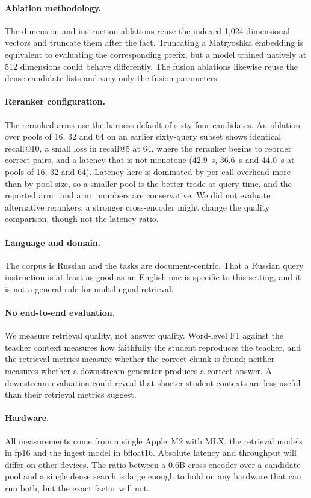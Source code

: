 \paragraph{Ablation methodology.}
The dimension and instruction ablations reuse the indexed 1{,}024-dimensional
vectors and truncate them after the fact. Truncating a Matryoshka embedding is
equivalent to evaluating the corresponding prefix, but a model trained natively
at 512 dimensions could behave differently. The fusion ablations likewise reuse
the dense candidate lists and vary only the fusion parameters.

\paragraph{Reranker configuration.}
The reranked arms use the harness default of sixty-four candidates. An ablation
over pools of 16, 32 and 64 on an earlier sixty-query subset shows identical
recall@10, a small loss in recall@5 at 64, where the reranker begins to reorder
correct pairs, and a latency that is not monotone (42.9~s, 36.6~s and 44.0~s at
pools of 16, 32 and 64). Latency here is dominated by per-call overhead more
than by pool size, so a smaller pool is the better trade at query time, and the
reported arm~ and arm~ numbers are conservative. We did not
evaluate alternative rerankers; a stronger cross-encoder might change the
quality comparison, though not the latency ratio.

\paragraph{Language and domain.}
The corpus is Russian and the tasks are document-centric. That a Russian query
instruction is at least as good as an English one is specific to this setting,
and it is not a general rule for multilingual retrieval.

\paragraph{No end-to-end evaluation.}
We measure retrieval quality, not answer quality. Word-level F1 against the
teacher context measures how faithfully the student reproduces the teacher, and
the retrieval metrics measure whether the correct chunk is found; neither
measures whether a downstream generator produces a correct answer. A downstream
evaluation could reveal that shorter student contexts are less useful than their
retrieval metrics suggest.

\paragraph{Hardware.}
All measurements come from a single Apple~M2 with MLX, the retrieval models in
fp16 and the ingest model in bfloat16. Absolute latency and throughput will
differ on other devices. The ratio between a 0.6B cross-encoder over a candidate
pool and a single dense search is large enough to hold on any hardware that can
run both, but the exact factor will not.

